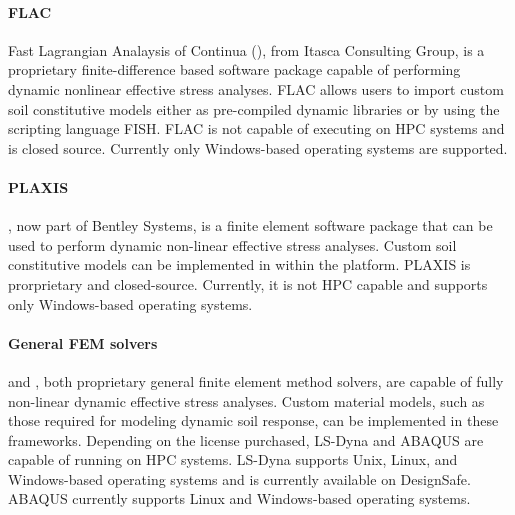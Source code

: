 \paragraph{FLAC}
Fast Lagrangian Analaysis of Continua (), from Itasca Consulting Group, is a proprietary finite-difference based software package capable of performing dynamic nonlinear effective stress analyses. FLAC allows users to import custom soil constitutive models either as pre-compiled dynamic libraries or by using the scripting language FISH. FLAC is not capable of executing on HPC systems and is closed source. Currently only Windows-based operating systems are supported.

\paragraph{PLAXIS}
, now part of Bentley Systems, is a finite element software package that can be used to perform dynamic non-linear effective stress analyses. Custom soil constitutive models can be implemented in within the platform. PLAXIS is prorprietary and closed-source. Currently, it is not HPC capable and supports only Windows-based operating systems.

\paragraph{General FEM solvers}
 and , both proprietary general finite element method solvers, are capable of fully non-linear dynamic effective stress analyses. Custom material models, such as those required for modeling dynamic soil response, can be implemented in these frameworks. Depending on the license purchased, LS-Dyna and ABAQUS are capable of running on HPC systems. LS-Dyna supports Unix, Linux, and Windows-based operating systems and is currently available on DesignSafe. ABAQUS currently supports Linux and Windows-based operating systems.




